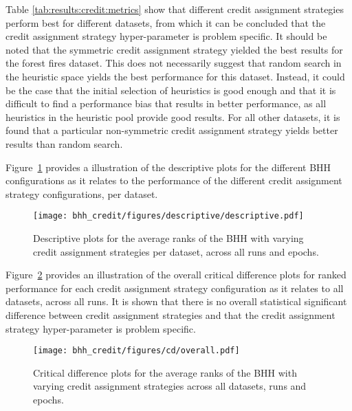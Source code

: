 \begin{table}[htbp]
{	}
\end{table}%

Table \ref{tab:results:credit:metrics} show that different credit assignment strategies perform best for different datasets, from which it can be concluded that the credit assignment strategy hyper-parameter is problem specific. It should be noted that the symmetric credit assignment strategy yielded the best results for the forest fires dataset. This does not necessarily suggest that random search in the heuristic space yields the best performance for this dataset. Instead, it could be the case that the initial selection of heuristics is good enough and that it is difficult to find a performance bias that results in better performance, as all heuristics in the heuristic pool provide good results. For all other datasets, it is found that a particular non-symmetric credit assignment strategy yields better results than random search.

Figure~\ref{fig:results:credit:descriptive:descriptive} provides a illustration of the descriptive plots for the different \acs{BHH} configurations as it relates to the performance of the different credit assignment strategy configurations, per dataset.

\begin{figure}[htbp]
	\centering
	\texttt{[image: bhh\_credit/figures/descriptive/descriptive.pdf]}
	\caption{Descriptive plots for the average ranks of the \acs{BHH} with varying credit assignment strategies per dataset, across all runs and epochs.}
	\label{fig:results:credit:descriptive:descriptive}
\end{figure}

Figure~\ref{fig:results:credit:descriptive:cd} provides an illustration of the overall critical difference plots for ranked performance for each credit assignment strategy configuration as it relates to all datasets, across all runs. It is shown that there is no overall statistical significant difference between credit assignment strategies and that the credit assignment strategy hyper-parameter is problem specific.

\begin{figure}[htbp]
	\centering
	\texttt{[image: bhh\_credit/figures/cd/overall.pdf]}
	\caption{Critical difference plots for the average ranks of the \acs{BHH} with varying credit assignment strategies across all datasets, runs and epochs.}
	\label{fig:results:credit:descriptive:cd}
\end{figure}

